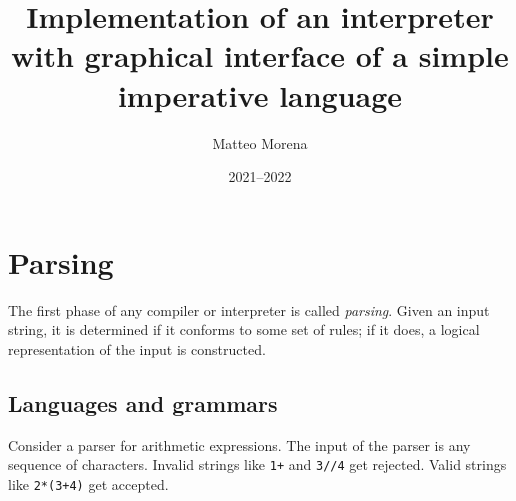 \documentclass[11pt, american, draft]{PhdThesis}
\author{Matteo Morena}
\title{Implementation of an interpreter with graphical interface of a simple imperative language}
\date{2021--2022}
\begin{document}
  \pagestyle{empty}
  \maketitle




  \frontmatter
  \pagestyle{serif}
  \tableofcontents



  \mainmatter



  \chapter{Parsing}

  The first phase of any compiler or interpreter is called \emph{parsing}. Given an input string, it
  is determined if it conforms to some set of rules; if it does, a logical representation of the
  input is constructed.

  \section{Languages and grammars}

  Consider a parser for arithmetic expressions. The input of the parser is any sequence of
  characters. Invalid strings like \verb$1+$ and \verb$3//4$ get rejected. Valid strings like
  \verb$2*(3+4)$ get accepted.
\end{document}
